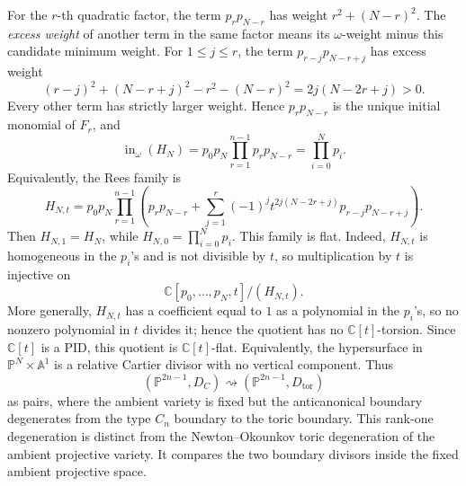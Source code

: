 \documentclass{article}
\newcommand{\CC}{\mathbb{C}}
\newcommand{\PP}{\mathbb{P}}
\begin{document}
For the \(r\)-th quadratic factor, the term \(p_rp_{N-r}\) has weight \(r^2+(N-r)^2\). The \emph{excess weight} of another term in the same factor means its \(\omega\)-weight minus this candidate minimum weight. For \(1\leq j\leq r\), the term \(p_{r-j}p_{N-r+j}\) has excess weight
\[
(r-j)^2+(N-r+j)^2-r^2-(N-r)^2=2j(N-2r+j)>0.
\]
Every other term has strictly larger weight. Hence \(p_rp_{N-r}\) is the unique initial monomial of \(F_r\), and
\[
\operatorname{in}_\omega(H_N)
=p_0p_N\prod_{r=1}^{n-1}p_rp_{N-r}
=\prod_{i=0}^Np_i.
\]
Equivalently, the Rees family is
\[
H_{N,t}=p_0p_N\prod_{r=1}^{n-1}
\left(p_rp_{N-r}+\sum_{j=1}^r(-1)^jt^{2j(N-2r+j)}p_{r-j}p_{N-r+j}\right).
\]
Then \(H_{N,1}=H_N\), while \(H_{N,0}=\prod_{i=0}^Np_i\). This family is flat. Indeed, \(H_{N,t}\) is homogeneous in the \(p_i\)'s and is not divisible by \(t\), so multiplication by \(t\) is injective on
\[
\CC[p_0,\ldots,p_N,t]/(H_{N,t}).
\]
More generally, \(H_{N,t}\) has a coefficient equal to \(1\) as a polynomial in the \(p_i\)'s, so no nonzero polynomial in \(t\) divides it; hence the quotient has no \(\CC[t]\)-torsion. Since \(\CC[t]\) is a PID, this quotient is \(\CC[t]\)-flat. Equivalently, the hypersurface in \(\PP^N\times\mathbb A^1\) is a relative Cartier divisor with no vertical component. Thus
\[
(\PP^{2n-1},D_C)
\rightsquigarrow
(\PP^{2n-1},D_{\mathrm{tor}})
\]
as pairs, where the ambient variety is fixed but the anticanonical boundary degenerates from the type \(C_n\) boundary to the toric boundary.
This rank-one degeneration is distinct from the Newton--Okounkov toric degeneration of the ambient projective variety. It compares the two boundary divisors inside the fixed ambient projective space.
\end{document}
